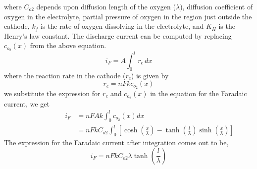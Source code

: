 \documentclass[Notes.tex]{subfiles}
\begin{document}
where $C_{o2}$ depends upon diffusion length of the oxygen ($\lambda$), diffusion coefficient of oxygen in the electrolyte, partial pressure of oxygen in the region just outside the cathode, $k_f$ is the rate of oxygen dissolving in the electrolyte, and $K_H$ is the Henry's law constant.
The discharge current can be computed by replacing $c_{o_2}(x)$ from the above equation.
\begin{equation}
	i_F = A\int_{0}^{l} r_c\,dx
\end{equation}
where the reaction rate in the cathode ($r_c$) is given by
\begin{equation}
	r_c = nFkc_{o_2}(x)
\end{equation}
we substitute the expression for $r_c$ and $c_{o_2}(x)$ in the equation for the Faradaic current, we get
\begin{align}
	\qquad\qquad\qquad i_F &= nFAk\int_{0}^{l}c_{o_2}(x)dx \label{eq:dc_faradaic_current_integral}\\
	&= nFkC_{o2}\int_{0}^{l} \left[ \cosh{\left(\frac{x}{\lambda}\right)} - \tanh{\left(\frac{l}{\lambda}\right)} \sinh{\left(\frac{x}{\lambda}\right)} \right]\nonumber
\end{align}
The expression for the Faradaic current after integration comes out to be,
\begin{equation}
	i_F  =nFkC_{o2}\lambda\tanh{\left(\frac{l}{\lambda}\right)}\label{eq:faradaic_current_w_kinetics_diffusion}
\end{equation}
\end{document}
